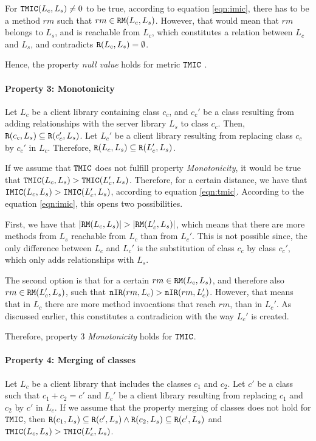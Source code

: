 For $\verb|TMIC|(L_c, L_s) \neq 0$ to be true, according to equation \ref{eqn:imic}, there has to be a method $rm$ such that  $rm \in \verb|RM|(L_c,L_s)$. However, that would mean that $rm$ belongs to $L_s$, and is reachable from $L_c$, which constitutes a relation between $L_c$ and $L_s$, and contradicts $\verb|R|(L_c, L_s) = \emptyset$.

Hence, the property \textit{null value} holds for metric $\verb|TMIC|$ .

\paragraph{Property 3: Monotonicity}
Let $L_c$ be a client library containing class $c_c$, and $c_c'$ be a class resulting from adding relationships with the server library $L_s$ to class $c_c$. Then, $\verb|R|(c_c, L_s) \subseteq \verb|R|(c_c', L_s)$. Let $L_c'$ be a client library resulting from replacing class $c_c$ by $c_c'$ in $L_c$. Therefore, $\verb|R|(L_c, L_s) \subseteq \verb|R|(L_c', L_s)$.

If we assume that $\verb|TMIC|$ does not fulfill property \textit{Monotonicity}, it would be true that $\verb|TMIC|(L_c, L_s) > \verb|TMIC|(L_c', L_s)$. Therefore, for a certain distance, we have that $\verb|IMIC|(L_c,L_s) > \verb|IMIC|(L_c',L_s)$, according to equation \ref{eqn:tmic}. According to the equation \ref{eqn:imic}, this opens two possibilities.

First, we have that $|\verb|RM|(L_c,L_s)| > |\verb|RM|(L_c',L_s)|$, which means that there are more methods from $L_s$ reachable from $L_c$ than from $L_c'$. This is not possible since, the only difference between $L_c$ and $L_c'$ is the substitution of class $c_c$ by class $c_c'$, which only adds relationships with $L_s$.

The second option is that for a certain $rm \in \verb|RM|(L_c,L_s)$, and therefore also $rm \in \verb|RM|(L_c',L_s)$, such that   $\verb|nIR|(rm,L_c) > \verb|nIR|(rm,L_c')$. However, that means that in $L_c$ there are more method invocations that reach $rm$, than in $L_c'$. As discussed earlier, this constitutes a contradicion with the way $L_c'$ is created.

Therefore, property 3 \textit{Monotonicity} holds for $\verb|TMIC|$.

\paragraph{Property 4: Merging of classes}
Let $L_c$ be a client library that includes the classes $c_1$ and $c_2$. Let $c'$ be a class such that $c_1 + c_2 = c'$ and $L_c'$ be a client library resulting from replacing $c_1$ and $c_2$ by $c'$ in $L_c$. If we assume that the property merging of classes does not hold for $\verb|TMIC|$, then $\verb|R|(c_1, L_s) \subseteq \verb|R|(c', L_s) \land \verb|R|(c_2, L_s) \subseteq \verb|R|(c', L_s)$ and $\verb|TMIC|(L_c, L_s) > \verb|TMIC|(L_c', L_s)$.

